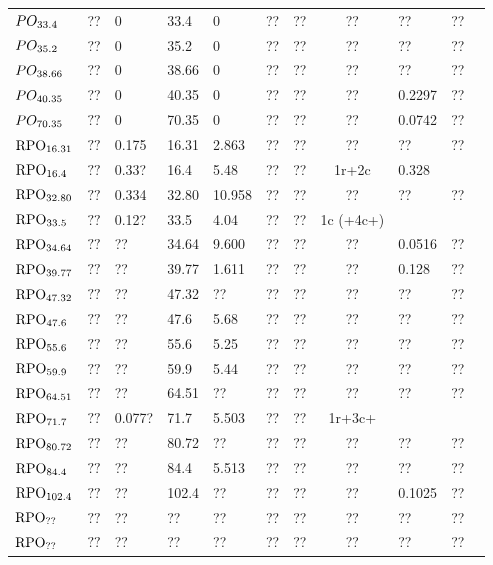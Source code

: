 \documentclass[aip,cha,showpacs,reprint]{revtex4-1} %
\begin{document}
\begin{table*}
\begin{tabular}{lclllllclll}
   $PO_{33.4}$  & ?? & $0$ & 33.4 & 0 & ?? & ?? & ?? & ?? & ?? \\
   $PO_{35.2}$  & ?? & $0$ & 35.2 & 0 & ?? & ?? & ?? & ?? & ?? \\
   $PO_{38.66}$  & ?? & $0$ & 38.66 & 0 & ?? & ?? & ?? & ?? & ?? \\
   $PO_{40.35}$  & ?? & $0$ & 40.35 & 0 & ?? & ?? & ?? & 0.2297 & ?? \\
   $PO_{70.35}$ & $??$ & $0$ & 70.35 & 0 & ?? & ?? & ?? & 0.0742 & ??  \\
   $\mathrm{RPO}_{16.31}$ & $??$ & 0.175 & 16.31 & 2.863 & ?? & ?? & ?? & ?? & ??  \\
   $\mathrm{RPO}_{16.4}$ & $??$ & 0.33?    & 16.4 & 5.48 & ?? & ?? & 1r+2c & 0.328 \\
   $\mathrm{RPO}_{32.80}$ & $??$ & 0.334 & 32.80 & 10.958 & ?? & ?? & ?? & ?? & ??  \\
   $\mathrm{RPO}_{33.5}$ & $??$ & 0.12? & 33.5 & 4.04 & ?? & ?? & 1c (+4c+) \\
   $\mathrm{RPO}_{34.64}$ & $??$ & ?? & 34.64 & 9.600 & ?? & ?? & ?? & 0.0516 & ??  \\
   $\mathrm{RPO}_{39.77}$ & $??$ & ?? & 39.77 & 1.611 & ?? & ?? & ?? & 0.128 & ??  \\
   $\mathrm{RPO}_{47.32}$ & $??$ & ?? & 47.32 & ?? & ?? & ?? & ?? & ?? & ??  \\
   $\mathrm{RPO}_{47.6}$  & $??$ & ?? & 47.6  & 5.68 & ?? & ?? & ?? & ?? & ??  \\
   $\mathrm{RPO}_{55.6}$ & $??$ & ?? & 55.6 & 5.25 & ?? & ?? & ?? & ?? & ??  \\
   $\mathrm{RPO}_{59.9}$ & $??$ & ?? & 59.9 & 5.44 & ?? & ?? & ?? & ?? & ??  \\
   $\mathrm{RPO}_{64.51}$ & $??$ & ?? & 64.51 & ?? & ?? & ?? & ?? & ?? & ??  \\
   $\mathrm{RPO}_{71.7}$ & $??$ & 0.077? & 71.7 & 5.503 & ?? & ?? & 1r+3c+  \\
   $\mathrm{RPO}_{80.72}$ & $??$ & ?? & 80.72 & ?? & ?? & ?? & ?? & ?? & ??  \\
   $\mathrm{RPO}_{84.4}$  & $??$ & ?? & 84.4  & 5.513 & ?? & ?? & ?? & ?? & ??  \\
   $\mathrm{RPO}_{102.4}$ & $??$ & ?? & 102.4 & ?? & ?? & ?? & ?? & 0.1025 & ??  \\
   $\mathrm{RPO}_{??}$ & $??$ & ?? & ?? & ?? & ?? & ?? & ?? & ?? & ??  \\
   $\mathrm{RPO}_{??}$ & $??$ & ?? & ?? & ?? & ?? & ?? & ?? & ?? & ??
   \end{tabular}
\end{table*}
\end{document}
